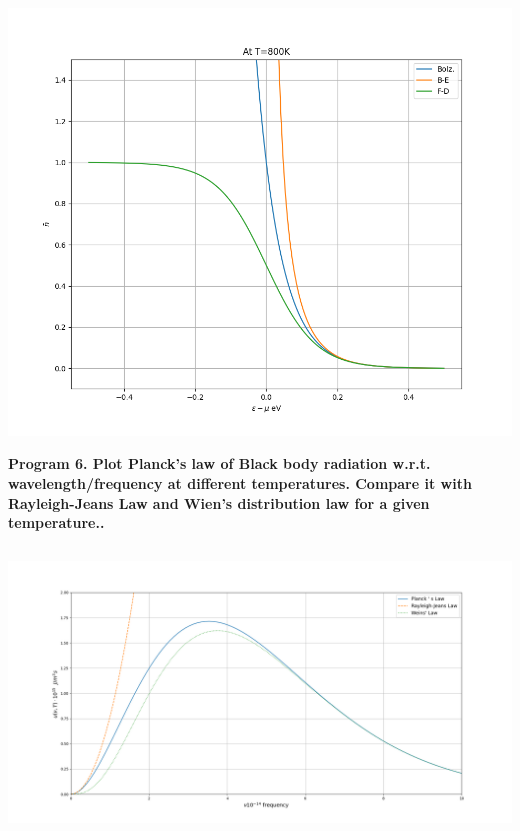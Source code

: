 \documentclass{article}
\begin{document}
	\includegraphics[width=15 cm]{prac_6_800k.png}

	\textbf{Program 6. Plot Planck’s law of Black body radiation w.r.t. wavelength/frequency at different
		temperatures. Compare it with Rayleigh-Jeans Law and Wien’s distribution law for a
		given temperature..}\\
	\inputminted{python}{prac_8.py}
	\includegraphics[width=15 cm]{prac_8.png}	
	
\end{document}

